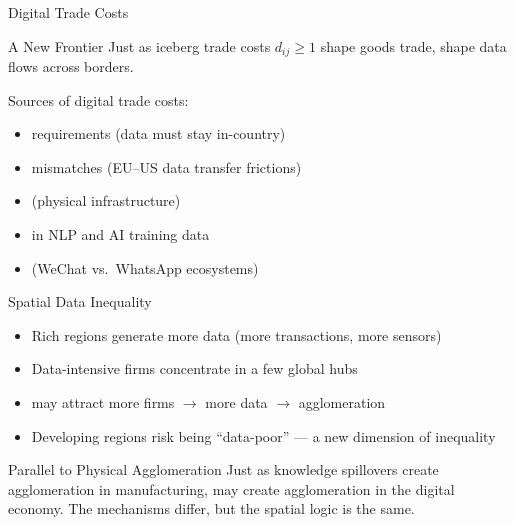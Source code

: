 \documentclass{beamer}
\begin{document}
\begin{frame}{Digital Trade Costs}

    \begin{exampleblock}{A New Frontier}
        Just as iceberg trade costs $d_{ij} \geq 1$ shape goods trade,  shape data flows across borders.
    \end{exampleblock}

    \vspace{0.5em}
    Sources of digital trade costs:
    \begin{itemize}
        \item {} requirements (data must stay in-country)
        \item {} mismatches (EU--US data transfer frictions)
        \item {} (physical infrastructure)
        \item {} in NLP and AI training data
        \item {} (WeChat vs.\ WhatsApp ecosystems)
    \end{itemize}

    \vspace{0.3em}

\end{frame}

\begin{frame}{Spatial Data Inequality}

    \begin{itemize}
        \item Rich regions generate more data (more transactions, more sensors)
        \item Data-intensive firms concentrate in a few global hubs
        \item {} may attract more firms $\rightarrow$ more data $\rightarrow$ agglomeration
        \item Developing regions risk being ``data-poor'' --- a new dimension of inequality
    \end{itemize}

    \vspace{1em}
    \begin{block}{Parallel to Physical Agglomeration}
        Just as knowledge spillovers create agglomeration in manufacturing,  may create agglomeration in the digital economy. The mechanisms differ, but the spatial logic is the same.
    \end{block}

\end{frame}
\end{document}
